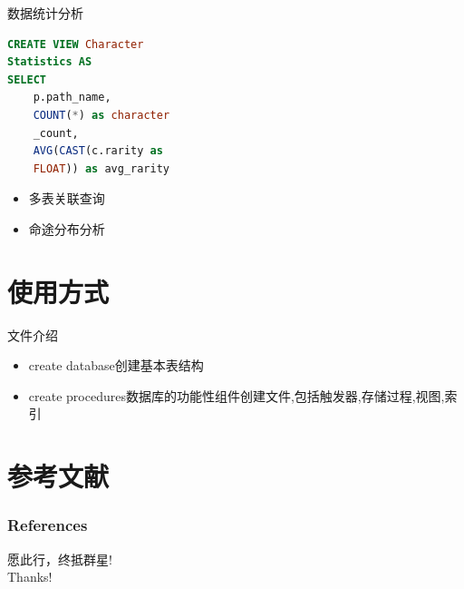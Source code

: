 \documentclass{beamer}
\begin{document}
\begin{frame}[fragile]{数据统计分析}
    \begin{minipage}{0.6\linewidth}
\begin{lstlisting}[language=sql]
CREATE VIEW Character
Statistics AS
SELECT 
    p.path_name,
    COUNT(*) as character
    _count,
    AVG(CAST(c.rarity as 
    FLOAT)) as avg_rarity
\end{lstlisting}
    \end{minipage}\hspace{0.5cm}
    \begin{minipage}{0.25\linewidth}
        \begin{itemize}
            \item 多表关联查询
            \item 命途分布分析
            
        \end{itemize}
    \end{minipage}
    \medskip
\end{frame}




\section{使用方式}
\begin{frame}{文件介绍}
    \begin{itemize}
        \item {create database}创建基本表结构
        \item {create procedures}数据库的功能性组件创建文件,包括触发器,存储过程,视图,索引
    \end{itemize}
\end{frame}

\section{参考文献}

\begin{frame}
 \frametitle{References}
 
\end{frame}

\begin{frame}
    \begin{center}
    {\Huge 愿此行，终抵群星!}\\
    \vspace{0.9cm}
        {\Huge\calligra Thanks!}
    \end{center}
\end{frame}
\end{document}
